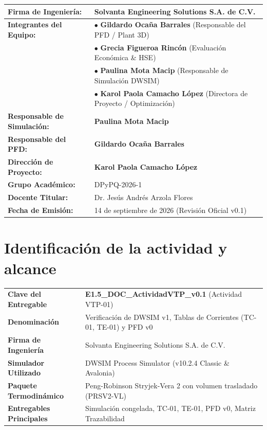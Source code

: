 \documentclass[11pt,letterpaper]{article}
\begin{document}
\begin{center}
\small
\begin{tabular}{p{4.5cm}p{9.5cm}}
\toprule
\textbf{Firma de Ingeniería:} & \textbf{Solvanta Engineering Solutions S.A. de C.V.} \\
\midrule
\textbf{Integrantes del Equipo:} & 
$\bullet$ \textbf{Gildardo Ocaña Barrales} (Responsable del PFD / Plant 3D) \\
& $\bullet$ \textbf{Grecia Figueroa Rincón} (Evaluación Económica \& HSE) \\
& $\bullet$ \textbf{Paulina Mota Macip} (Responsable de Simulación DWSIM) \\
& $\bullet$ \textbf{Karol Paola Camacho López} (Directora de Proyecto / Optimización) \\
\midrule
\textbf{Responsable de Simulación:} & \textbf{Paulina Mota Macip} \\
\textbf{Responsable del PFD:} & \textbf{Gildardo Ocaña Barrales} \\
\textbf{Dirección de Proyecto:} & \textbf{Karol Paola Camacho López} \\
\textbf{Grupo Académico:} & DPyPQ-2026-1 \\
\textbf{Docente Titular:} & Dr. Jesús Andrés Arzola Flores \\
\textbf{Fecha de Emisión:} & 14 de septiembre de 2026 (Revisión Oficial v0.1) \\
\bottomrule
\end{tabular}
\end{center}

\clearpage
\setcounter{page}{1}

\section{Identificación de la actividad y alcance}

\begin{center}
\small
\begin{tabularx}{\textwidth}{p{4.2cm}X}
\toprule
\textbf{Clave del Entregable} & \textbf{E1.5\_DOC\_ActividadVTP\_v0.1} (Actividad VTP-01) \\
\textbf{Denominación} & Verificación de DWSIM v1, Tablas de Corrientes (TC-01, TE-01) y PFD v0 \\
\textbf{Firma de Ingeniería} & Solvanta Engineering Solutions S.A. de C.V. \\
\textbf{Simulador Utilizado} & DWSIM Process Simulator (v10.2.4 Classic \& Avalonia) \\
\textbf{Paquete Termodinámico} & Peng-Robinson Stryjek-Vera 2 con volumen trasladado (PRSV2-VL) \\
\textbf{Entregables Principales} & Simulación congelada, TC-01, TE-01, PFD v0, Matriz Trazabilidad \\
\bottomrule
\end{tabularx}
\end{center}
\end{document}
